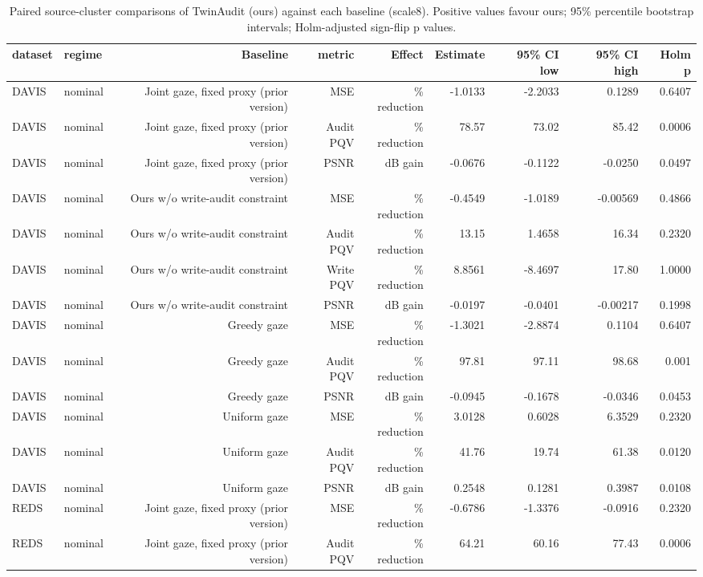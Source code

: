 \begin{table}[t]
\centering
\caption{Paired source-cluster comparisons of TwinAudit (ours) against each baseline (scale8). Positive values favour ours; 95\% percentile bootstrap intervals; Holm-adjusted sign-flip p values.}
\label{tab:paired_scale8}
\small
\begin{tabular}{llrrrrrrr}
\toprule
dataset & regime & Baseline & metric & Effect & Estimate & 95\% CI low & 95\% CI high & Holm p \\
\midrule
DAVIS & nominal & Joint gaze, fixed proxy (prior version) & MSE & \% reduction & -1.0133 & -2.2033 & 0.1289 & 0.6407 \\
DAVIS & nominal & Joint gaze, fixed proxy (prior version) & Audit PQV & \% reduction & 78.57 & 73.02 & 85.42 & 0.0006 \\
DAVIS & nominal & Joint gaze, fixed proxy (prior version) & PSNR & dB gain & -0.0676 & -0.1122 & -0.0250 & 0.0497 \\
DAVIS & nominal & Ours w/o write-audit constraint & MSE & \% reduction & -0.4549 & -1.0189 & -0.00569 & 0.4866 \\
DAVIS & nominal & Ours w/o write-audit constraint & Audit PQV & \% reduction & 13.15 & 1.4658 & 16.34 & 0.2320 \\
DAVIS & nominal & Ours w/o write-audit constraint & Write PQV & \% reduction & 8.8561 & -8.4697 & 17.80 & 1.0000 \\
DAVIS & nominal & Ours w/o write-audit constraint & PSNR & dB gain & -0.0197 & -0.0401 & -0.00217 & 0.1998 \\
DAVIS & nominal & Greedy gaze & MSE & \% reduction & -1.3021 & -2.8874 & 0.1104 & 0.6407 \\
DAVIS & nominal & Greedy gaze & Audit PQV & \% reduction & 97.81 & 97.11 & 98.68 & 0.001 \\
DAVIS & nominal & Greedy gaze & PSNR & dB gain & -0.0945 & -0.1678 & -0.0346 & 0.0453 \\
DAVIS & nominal & Uniform gaze & MSE & \% reduction & 3.0128 & 0.6028 & 6.3529 & 0.2320 \\
DAVIS & nominal & Uniform gaze & Audit PQV & \% reduction & 41.76 & 19.74 & 61.38 & 0.0120 \\
DAVIS & nominal & Uniform gaze & PSNR & dB gain & 0.2548 & 0.1281 & 0.3987 & 0.0108 \\
REDS & nominal & Joint gaze, fixed proxy (prior version) & MSE & \% reduction & -0.6786 & -1.3376 & -0.0916 & 0.2320 \\
REDS & nominal & Joint gaze, fixed proxy (prior version) & Audit PQV & \% reduction & 64.21 & 60.16 & 77.43 & 0.0006 \\

\end{tabular}
\end{table}
